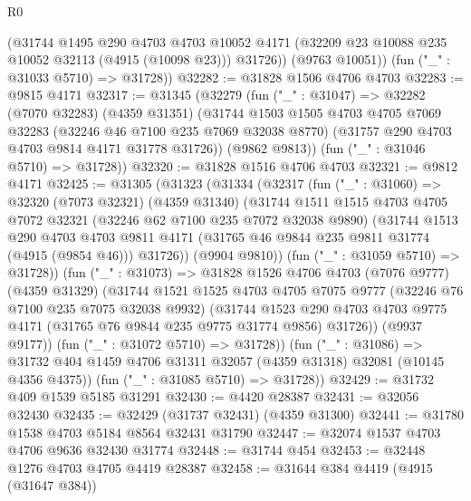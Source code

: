 \begin{lexlean}{R0}
\begin{coremodule}
          (@31744
            @1495
            @290
            @4703
            @4703
            @10052
            @4171
            (@32209 @23 @10088 @235 @10052 @32113 (@4915 (@10098 @23)))
            @31726))
        (@9763 @10051))
      (fun ("_" : @31033 @5710) => @31728))
@32282 := @31828 @1506 @4706 @4703
@32283 := @9815 @4171
@32317 := @31345
    (@32279
      (fun ("_" : @31047) =>
      @32282
        (@7070 @32283)
        (@4359 @31351)
        (@31744
          @1503
          @1505
          @4703
          @4705
          @7069
          @32283
          (@32246 @46 @7100 @235 @7069 @32038 @8770)
          (@31757 @290 @4703 @4703 @9814 @4171 @31778 @31726))
        (@9862 @9813))
      (fun ("_" : @31046 @5710) => @31728))
@32320 := @31828 @1516 @4706 @4703
@32321 := @9812 @4171
@32425 := @31305
    (@31323
      (@31334
        (@32317
          (fun ("_" : @31060) =>
          @32320
            (@7073 @32321)
            (@4359 @31340)
            (@31744
              @1511
              @1515
              @4703
              @4705
              @7072
              @32321
              (@32246 @62 @7100 @235 @7072 @32038 @9890)
              (@31744
                @1513
                @290
                @4703
                @4703
                @9811
                @4171
                (@31765 @46 @9844 @235 @9811 @31774 (@4915 (@9854 @46)))
                @31726))
            (@9904 @9810))
          (fun ("_" : @31059 @5710) => @31728))
        (fun ("_" : @31073) =>
        @31828
          @1526
          @4706
          @4703
          (@7076 @9777)
          (@4359 @31329)
          (@31744
            @1521
            @1525
            @4703
            @4705
            @7075
            @9777
            (@32246 @76 @7100 @235 @7075 @32038 @9932)
            (@31744
              @1523
              @290
              @4703
              @4703
              @9775
              @4171
              (@31765 @76 @9844 @235 @9775 @31774 @9856)
              @31726))
          (@9937 @9177))
        (fun ("_" : @31072 @5710) => @31728))
      (fun ("_" : @31086) =>
      @31732 @404 @1459 @4706 @31311 @32057 (@4359 @31318) @32081 (@10145 @4356 @4375))
      (fun ("_" : @31085 @5710) => @31728))
@32429 := @31732 @409 @1539 @5185 @31291
@32430 := @4420 @28387
@32431 := @32056 @32430
@32435 := @32429 (@31737 @32431) (@4359 @31300)
@32441 := @31780 @1538 @4703 @5184 @8564 @32431 @31790
@32447 := @32074 @1537 @4703 @4706 @9636 @32430 @31774
@32448 := @31744 @454
@32453 := @32448 @1276 @4703 @4705 @4419 @28387
@32458 := @31644 @384 @4419 (@4915 (@31647 @384))

\end{coremodule}
\end{lexlean}
